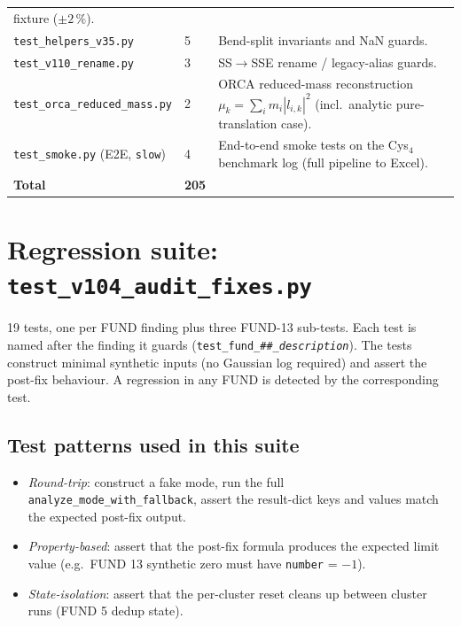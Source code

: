 \documentclass[10pt,a4paper,twoside]{article}
\newcommand{\fn}[1]{\texttt{#1}}
\begin{document}
\begin{longtable}{p{} p{} p{}}
    fixture ($\pm 2\,\%$). \\
\fn{test\_helpers\_v35.py} & 5 & Bend-split invariants and NaN guards. \\
\fn{test\_v110\_rename.py} & 3 & SS$\to$SSE rename / legacy-alias guards. \\
\fn{test\_orca\_reduced\_mass.py} & 2 & ORCA reduced-mass reconstruction
    $\mu_k = \sum_i m_i|l_{i,k}|^2$ (incl.\ analytic pure-translation case). \\
\fn{test\_smoke.py} (E2E, \texttt{slow}) & 4 & End-to-end smoke tests on
    the Cys$_4$ benchmark log (full pipeline to Excel). \\
\midrule
\textbf{Total} & \textbf{205} & \\
\bottomrule
\end{longtable}

\section{Regression suite: \fn{test\_v104\_audit\_fixes.py}}
\label{sec:regression-tests}

19 tests, one per FUND finding plus three FUND-13 sub-tests. Each
test is named after the finding it guards
(\texttt{test\_fund\_\#\#\_\textit{description}}). The tests
construct minimal synthetic inputs (no Gaussian log required) and
assert the post-fix behaviour. A regression in any FUND is
detected by the corresponding test.

\subsection{Test patterns used in this suite}

\begin{itemize}
  \item \emph{Round-trip}: construct a fake mode, run the full
        \fn{analyze\_mode\_with\_fallback}, assert the result-dict
        keys and values match the expected post-fix output.
  \item \emph{Property-based}: assert that the post-fix formula
        produces the expected limit value (e.g.\ FUND 13 synthetic
        zero must have \texttt{number} = $-1$).
  \item \emph{State-isolation}: assert that the per-cluster reset
        cleans up between cluster runs (FUND 5 dedup state).
\end{itemize}
\end{document}
